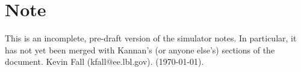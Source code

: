 \documentclass{article}
\begin{document}
\section*{Note}
This is an incomplete, pre-draft version of the simulator
notes.
In particular, it has not yet been merged with Kannan's
(or anyone else's)
sections of the document.  Kevin Fall (kfall@ee.lbl.gov).
(\today).







\end{document}
